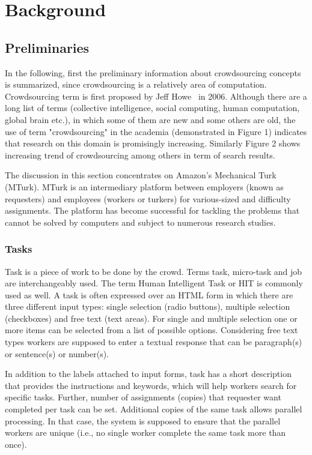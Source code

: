 \chapter{Background}

\section{Preliminaries}
In the following, first the preliminary information about crowdsourcing concepts 
is summarized, since crowdsourcing is a relatively area of computation. 
Crowdsourcing term is first proposed by Jeff Howe~\cite{Howe2006b} in 2006. 
Although there are a long list of terms (collective intelligence, social computing, 
human computation, global brain etc.), in which some of them are new and some 
others are old, the use of term "crowdsourcing" in the academia (demonstrated in 
Figure 1) indicates that research on this domain is promisingly increasing. 
Similarly Figure 2 shows increasing trend of crowdsourcing among others 
in term of search results.

The discussion in this section concentrates on Amazon's Mechanical Turk (MTurk).
MTurk is an intermediary platform between employers (known as requesters) 
and employees (workers or turkers) for various-sized and difficulty assignments. 
The platform has become successful for tackling the problems that cannot be 
solved by computers and subject to numerous research studies.

\subsection{Tasks}
Task is a piece of work to be done by the crowd. Terms task, micro-task and job 
are interchangeably used. The term Human Intelligent Task or HIT is commonly 
used as well. A task is often expressed over an HTML form in which there are three 
different input types: single selection (radio buttons), multiple selection (checkboxes) 
and free text (text areas). For single and multiple selection one or more items can be 
selected from a list of possible options. Considering free text types workers are 
supposed to enter a textual response that can be paragraph(s) or sentence(s) 
or number(s).

In addition to the labels attached to input forms, task has a short description 
that provides the instructions and keywords, which will help workers search for 
specific tasks. Further, number of assignments (copies) that requester want completed 
per task can be set. Additional copies of the same task allows parallel processing. 
In that case, the system is supposed to ensure that the parallel workers are unique 
(i.e., no single worker complete the same task more than once).

